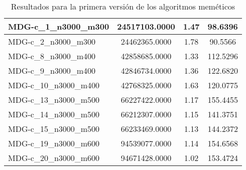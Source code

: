 \documentclass[10pt,a4paper]{article}
\begin{document}
\begin{table}[H]
\begin{center}
\begin{tabular}{|l|c|c|c|}
					MDG-c\_1\_n3000\_m300 & 24517103.0000 & 1.47 & 98.6396 \\ \hline
					MDG-c\_2\_n3000\_m300 & 24462365.0000 & 1.78 & 90.5566 \\ \hline
					MDG-c\_8\_n3000\_m400 & 42858685.0000 & 1.33 & 112.5296 \\ \hline
					MDG-c\_9\_n3000\_m400 & 42846734.0000 & 1.36 & 122.6820 \\ \hline
					MDG-c\_10\_n3000\_m400 & 42768325.0000 & 1.63 & 120.0775 \\ \hline
					MDG-c\_13\_n3000\_m500 & 66227422.0000 & 1.17 & 155.4455 \\ \hline
					MDG-c\_14\_n3000\_m500 & 66212307.0000 & 1.15 & 141.3751 \\ \hline
					MDG-c\_15\_n3000\_m500 & 66233469.0000 & 1.13 & 144.2372 \\ \hline
					MDG-c\_19\_n3000\_m600 & 94539077.0000 & 1.14 & 154.6568 \\ \hline
					MDG-c\_20\_n3000\_m600 & 94671428.0000 & 1.02 & 153.4724 \\ \hline
				\end{tabular}
				\caption{Resultados para la primera versión de los algoritmos meméticos}
				\label{}
				\end{center}
			\end{table}
			
\newpage
\end{document}
